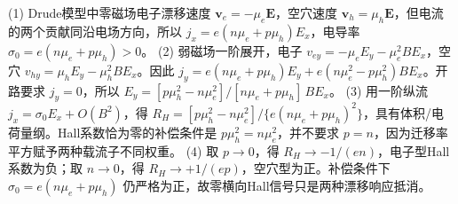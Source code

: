 (1) Drude模型中零磁场电子漂移速度 \(\mathbf v_e=-\mu_e\mathbf E\)，空穴速度 \(\mathbf v_h=\mu_h\mathbf E\)，但电流的两个贡献同沿电场方向，所以 \(j_x=e(n\mu_e+p\mu_h)E_x\)，电导率 \(\sigma_0=e(n\mu_e+p\mu_h)>0\)。
(2) 弱磁场一阶展开，电子 \(v_{ey}=-\mu_e E_y-\mu_e^2 B E_x\)，空穴 \(v_{hy}=\mu_h E_y-\mu_h^2 B E_x\)。因此 \(j_y=e(n\mu_e+p\mu_h)E_y+e(n\mu_e^2-p\mu_h^2)BE_x\)。开路要求 \(j_y=0\)，所以 \(E_y=[p\mu_h^2-n\mu_e^2]/[n\mu_e+p\mu_h]\,BE_x\)。
(3) 用一阶纵流 \(j_x=\sigma_0E_x+O(B^2)\)，得 \(R_H=[p\mu_h^2-n\mu_e^2]/\{e(n\mu_e+p\mu_h)^2\}\)，具有体积/电荷量纲。Hall系数恰为零的补偿条件是 \(p\mu_h^2=n\mu_e^2\)，并不要求 \(p=n\)，因为迁移率平方赋予两种载流子不同权重。
(4) 取 \(p\to0\)，得 \(R_H\to-1/(en)\)，电子型Hall系数为负；取 \(n\to0\)，得 \(R_H\to+1/(ep)\)，空穴型为正。补偿条件下 \(\sigma_0=e(n\mu_e+p\mu_h)\) 仍严格为正，故零横向Hall信号只是两种漂移响应抵消。
